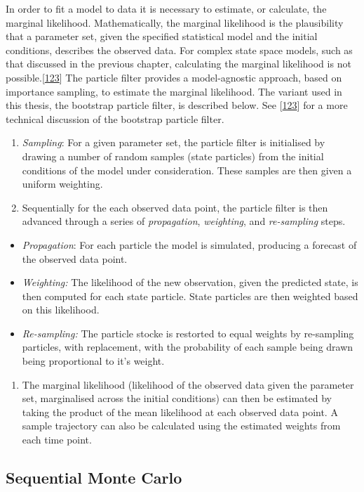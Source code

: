 \documentclass[11pt,twoside]{bristolthesis}
\providecommand{\tightlist}{%
  \setlength{\itemsep}{0pt}\setlength{\parskip}{0pt}}
\begin{document}
  In order to fit a model to data it is necessary to estimate, or calculate, the marginal likelihood. Mathematically, the marginal likelihood is the plausibility that a parameter set, given the specified statistical model and the initial conditions, describes the observed data. For complex state space models, such as that discussed in the previous chapter, calculating the marginal likelihood is not possible.{[}\protect\hyperlink{ref-Murray2015}{123}{]} The particle filter provides a model-agnostic approach, based on importance sampling, to estimate the marginal likelihood. The variant used in this thesis, the bootstrap particle filter, is described below. See {[}\protect\hyperlink{ref-Murray2015}{123}{]} for a more technical discussion of the bootstrap particle filter.
  \begin{enumerate}
  \def\labelenumi{\arabic{enumi}.}
  \item
    \emph{Sampling}: For a given parameter set, the particle filter is initialised by drawing a number of random samples (state particles) from the initial conditions of the model under consideration. These samples are then given a uniform weighting.
  \item
    Sequentially for the each observed data point, the particle filter is then advanced through a series of \emph{propagation}, \emph{weighting}, and \emph{re-sampling} steps.
  \end{enumerate}
  \begin{itemize}
  \item
    \emph{Propagation}: For each particle the model is simulated, producing a forecast of the observed data point.
  \item
    \emph{Weighting:} The likelihood of the new observation, given the predicted state, is then computed for each state particle. State particles are then weighted based on this likelihood.
  \item
    \emph{Re-sampling:} The particle stocke is restorted to equal weights by re-sampling particles, with replacement, with the probability of each sample being drawn being proportional to it's weight.
  \end{itemize}
  \begin{enumerate}
  \def\labelenumi{\arabic{enumi}.}
  \setcounter{enumi}{2}
  \tightlist
  \item
    The marginal likelihood (likelihood of the observed data given the parameter set, marginalised across the initial conditions) can then be estimated by taking the product of the mean likelihood at each observed data point. A sample trajectory can also be calculated using the estimated weights from each time point.
  \end{enumerate}
  \hypertarget{sequential-monte-carlo}{%
  \subsection{Sequential Monte Carlo}\label{sequential-monte-carlo}}
  
\end{document}
